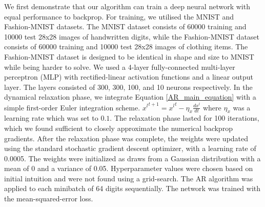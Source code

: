 We first demonstrate that our algorithm can train a deep neural network with equal performance to backprop. For training, we utilised the MNIST and Fashion-MNIST \citep{xiao2017online} datasets. The MNIST dataset consists of 60000 training and 10000 test 28x28 images of handwritten digits, while the Fashion-MNIST dataset consists of 60000 training and 10000 test 28x28 images of clothing items. The Fashion-MNIST dataset is designed to be identical in shape and size to MNIST while being harder to solve. We used a 4-layer fully-connected multi-layer perceptron (MLP) with rectified-linear activation functions and a linear output layer. The layers consisted of 300, 300, 100, and 10 neurons respectively. In the dynamical relaxation phase, we integrate  Equation \ref{AR_main_equation} with a simple first-order Euler integration scheme. ${x^l}^{t+1} = {x^l}^t - \eta_x \frac{dx^l}{dt}$ where $\eta_x$ was a learning rate which was set to $0.1$. The relaxation phase lasted for 100 iterations, which we found sufficient to  closely approximate the numerical backprop gradients. After the relaxation phase was complete, the weights were updated using the standard stochastic gradient descent optimizer, with a learning rate of 0.0005. The weights were initialized as draws from a Gaussian distribution with a mean of 0 and a variance of 0.05.  Hyperparameter values were chosen based on initial intuition and were not found using a grid-search. 
The AR algorithm was applied to each minibatch of 64 digits sequentially. The network was trained with the mean-squared-error loss.
